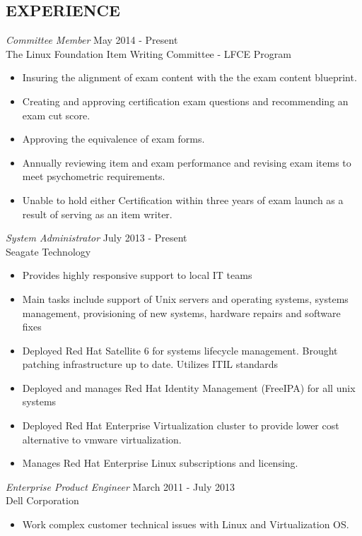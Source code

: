 \documentclass[margin]{res}
\begin{document}
\begin{resume}
\section{EXPERIENCE} 
	{\sl Committee Member} \hfill May 2014 - Present \\
    The Linux Foundation Item Writing Committee - LFCE Program
    \begin{itemize}  \itemsep -2pt %
    \item Insuring the alignment of exam content with the the exam content blueprint.
    \item Creating and approving certification exam questions and recommending an exam cut score.
    \item Approving the equivalence of exam forms.
    \item Annually reviewing item and exam performance and revising exam items to meet psychometric requirements.
    \item Unable to hold either Certification within three years of exam launch as a result of serving as an item writer.
    \end{itemize}
	{\sl System Administrator} \hfill July 2013 - Present \\
	Seagate Technology
	\begin{itemize}  \itemsep -2pt %
		\item Provides highly responsive support to local IT teams
		\item Main tasks include support of Unix servers and operating systems, systems management, provisioning of new systems, hardware repairs and software fixes
		\item Deployed Red Hat Satellite 6 for systems lifecycle management. Brought patching infrastructure up to date. Utilizes ITIL standards
		\item Deployed and manages Red Hat Identity Management (FreeIPA) for all unix systems
		\item Deployed Red Hat Enterprise Virtualization cluster to provide lower cost alternative to vmware virtualization. 
		\item Manages Red Hat Enterprise Linux subscriptions and licensing. 
	\end{itemize}
 	{\sl Enterprise Product Engineer} \hfill March 2011 - July 2013 \\
 	Dell Corporation
 	\begin{itemize}  \itemsep -2pt %
 		\item Work complex customer technical issues with Linux and Virtualization OS.

\end{itemize}
\end{resume}
\end{document}
